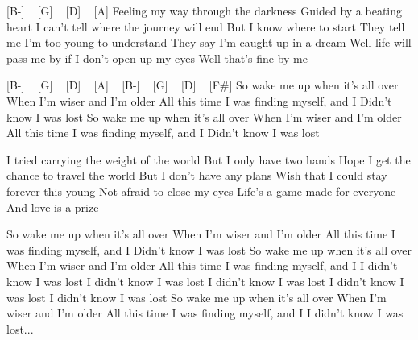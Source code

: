 \begin{guitar}

[B-] ~ [G] ~ [D] ~ [A]
Feeling my way through the darkness
Guided by a beating heart
I can't tell where the journey will end
But I know where to start
They tell me I'm too young to understand
They say I'm caught up in a dream
Well life will pass me by if I don't open up my eyes
Well that's fine by me


[B-] ~ [G] ~ [D] ~ [A] ~
[B-] ~ [G] ~ [D] ~ [F#]
So wake me up when it's all over
When I'm wiser and I'm older
All this time I was finding myself, and I
Didn't know I was lost
So wake me up when it's all over
When I'm wiser and I'm older
All this time I was finding myself, and I
Didn't know I was lost

I tried carrying the weight of the world
But I only have two hands
Hope I get the chance to travel the world
But I don't have any plans
Wish that I could stay forever this young
Not afraid to close my eyes
Life's a game made for everyone
And love is a prize

So wake me up when it's all over
When I'm wiser and I'm older
All this time I was finding myself, and I
Didn't know I was lost
So wake me up when it's all over
When I'm wiser and I'm older
All this time I was finding myself, and I
I didn't know I was lost
I didn't know I was lost
I didn't know I was lost
I didn't know I was lost
I didn't know I was lost
So wake me up when it's all over
When I'm wiser and I'm older
All this time I was finding myself, and I
I didn't know I was lost...

 \end{guitar}